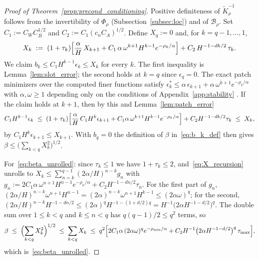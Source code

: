 \documentclass[hidelinks]{siamart}
\theoremstyle{nonumberplain}
\numberwithin{theorem}{section}
\begin{document}
\begin{proof}[Proof of Theorem~\textup{\ref{prop:precond_conditioning}}]
Positive definiteness of $\widetilde{K}_\rho^{-1}$ follows from the
invertibility of $\Phi_\rho$ (Subsection~\ref{subsec:loc}) and of
$\mathcal{B}_\rho$.  Set $C_1 := C_W C_B^{1/2}$ and $C_2 := C_1 (c_n C_A)^{1/2}$.
Define $X_q := 0$ and, for $k = q-1, \ldots, 1$,
\begin{equation}\label{eq:X_recursion}
  X_k \;:=\; (1 + \tau_k)\Bigl[ \frac{\alpha}{H}\, X_{k+1}
    + C_1\, \alpha\, \omega^{k+1} H^{k-1} e^{-\rho_k/\alpha} \Bigr]
    + C_2\, H^{-1 - dk/2}\, \tau_k .
\end{equation}
We claim $b_k \leq C_1 H^{k-1} \epsilon_k \leq X_k$ for every $k$.  The
first inequality is Lemma~\ref{lem:slot_error}; the second holds at
$k = q$ since $\epsilon_q = 0$.  The exact patch minimizers over the
computed finer functions satisfy
$\epsilon^\ast_k \leq \alpha\, \epsilon_{k+1} + \alpha\, \omega^{k+1} e^{-\rho_k/\alpha}$
with $\alpha, \omega \geq 1$ depending only on the conditions of
Appendix~\ref{app:stability} \cite[Lemma~16.33,
eq.~(16.167)]{Owhadi_Scovel_2019}.
If the claim holds at $k+1$, then by this and Lemma~\ref{lem:patch_error}
\[
  C_1 H^{k-1} \epsilon_k
  \;\leq\; (1+\tau_k)\Bigl[ \frac{\alpha}{H}\, C_1 H^{k} \epsilon_{k+1}
    + C_1 \alpha\, \omega^{k+1} H^{k-1} e^{-\rho_k/\alpha} \Bigr]
    + C_2 H^{-1-dk/2} \tau_k
  \;\leq\; X_k ,
\]
by $C_1 H^k \epsilon_{k+1} \leq X_{k+1}$.  With $b_q = 0$ the definition
of $\beta$ in~\eqref{eq:b_k_def} then gives
$\beta \leq \bigl(\sum_{k<q} X_k^2\bigr)^{1/2}$.

For~\eqref{eq:beta_unrolled}: since $\tau_k \leq 1$ we have
$1 + \tau_k \leq 2$, and~\eqref{eq:X_recursion} unrolls to
$X_k \leq \sum_{n=k}^{q-1} (2\alpha/H)^{n-k} g_n$ with
$g_n := 2 C_1 \alpha\, \omega^{n+1} H^{n-1} e^{-\rho_n/\alpha}
 + C_2 H^{-1-dn/2} \tau_n$.  For the first part of $g_n$,
$(2\alpha/H)^{n-k} \omega^{n+1} H^{n-1} = (2\alpha)^{n-k} \omega^{n+1} H^{k-1}
 \leq (2\alpha\omega)^q$; for the second,
$(2\alpha/H)^{n-k} H^{-1-dn/2} \leq (2\alpha)^q H^{-1-(1+d/2)q}
 = H^{-1}\bigl(2\alpha H^{-1-d/2}\bigr)^q$.  The double sum over
$1 \leq k < q$ and $k \leq n < q$ has $q(q-1)/2 \leq q^2$ terms, so
\[
  \beta \;\leq\; \Bigl( \sum_{k<q} X_k^2 \Bigr)^{1/2}
  \;\leq\; \sum_{k<q} X_k
  \;\leq\; q^2 \Bigl[ 2 C_1 \alpha\, (2\alpha\omega)^q e^{-\rho_{\min}/\alpha}
    + C_2 H^{-1} \bigl(2\alpha H^{-1-d/2}\bigr)^q\, \tau_{\max} \Bigr] ,
\]
which is~\eqref{eq:beta_unrolled}.


\end{proof}
\end{document}
